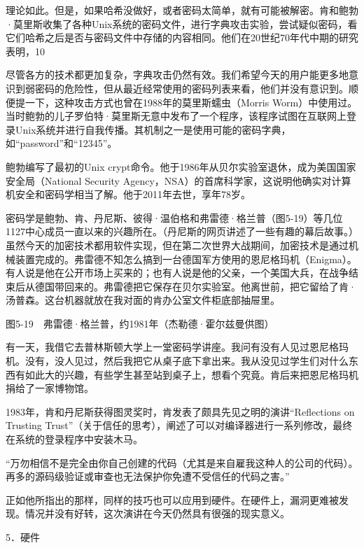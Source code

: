 \documentclass[a4paper,12pt,UTF8,twoside]{ctexbook}
\begin{document}
理论如此。但是，如果哈希没做好，或者密码太简单，就有可能被解密。肯和鲍勃·莫里斯收集了各种Unix系统的密码文件，进行字典攻击实验，尝试疑似密码，看它们哈希之后是否与密码文件中存储的内容相同。他们在20世纪70年代中期的研究表明，10%

尽管各方的技术都更加复杂，字典攻击仍然有效。我们希望今天的用户能更多地意识到弱密码的危险性，但从最近经常使用的密码列表来看，他们并没有意识到。顺便提一下，这种攻击方式也曾在1988年的莫里斯蠕虫（Morris Worm）中使用过。当时鲍勃的儿子罗伯特·莫里斯无意中发布了一个程序，该程序试图在互联网上登录Unix系统并进行自我传播。其机制之一是使用可能的密码字典，如“password”和“12345”。

鲍勃编写了最初的Unix crypt命令。他于1986年从贝尔实验室退休，成为美国国家安全局（National Security Agency，NSA）的首席科学家，这说明他确实对计算机安全和密码学相当了解。他于2011年去世，享年78岁。

密码学是鲍勃、肯、丹尼斯、彼得·温伯格和弗雷德·格兰普（图5-19）等几位1127中心成员一直以来的兴趣所在。（丹尼斯的网页讲述了一些有趣的幕后故事。）虽然今天的加密技术都用软件实现，但在第二次世界大战期间，加密技术是通过机械装置完成的。弗雷德不知怎么搞到一台德国军方使用的恩尼格玛机（Enigma）。有人说是他在公开市场上买来的；也有人说是他的父亲，一个美国大兵，在战争结束后从德国带回来的。弗雷德把它保存在贝尔实验室。他离世前，把它留给了肯·汤普森。这台机器就放在我对面的肯办公室文件柜底部抽屉里。



图5-19　弗雷德·格兰普，约1981年（杰勒德·霍尔兹曼供图）

有一天，我借它去普林斯顿大学上一堂密码学讲座。我问有没有人见过恩尼格玛机。没有，没人见过，然后我把它从桌子底下拿出来。我从没见过学生们对什么东西有如此大的兴趣，有些学生甚至站到桌子上，想看个究竟。肯后来把恩尼格玛机捐给了一家博物馆。

1983年，肯和丹尼斯获得图灵奖时，肯发表了颇具先见之明的演讲“Reflections on Trusting Trust”（关于信任的思考），阐述了可以对编译器进行一系列修改，最终在系统的登录程序中安装木马。

“万勿相信不是完全由你自己创建的代码（尤其是来自雇我这种人的公司的代码）。再多的源码级验证或审查也无法保护你免遭不受信任的代码之害。”



正如他所指出的那样，同样的技巧也可以应用到硬件。在硬件上，漏洞更难被发现。情况并没有好转，这次演讲在今天仍然具有很强的现实意义。





5．硬件
\end{document}
